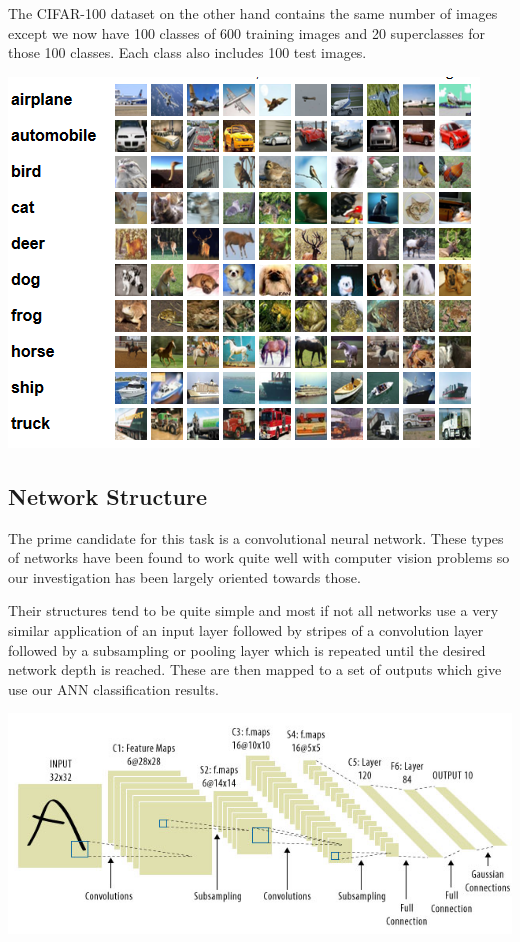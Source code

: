 \documentclass[a0,portrait]{a0poster}
\begin{document}
\begin{multicols}{2}
The CIFAR-100 dataset on the other hand contains the same number of images except we now have 100 classes of 600 training images and 20 superclasses for those 100 classes. Each class also includes 100 test images.
\begin{center}\vspace{1cm}
	\includegraphics[width=0.8\linewidth]{cifar10}
\end{center}\vspace{1cm}

\subsection{Network Structure}
The prime candidate for this task is a convolutional neural network. These types of networks have been found to work quite well with computer vision problems so our investigation has been largely oriented towards those.

Their structures tend to be quite simple and most if not all networks use a very similar application of an input layer followed by stripes of a convolution layer followed by a subsampling or pooling layer which is repeated until the desired network depth is reached. These are then mapped to a set of outputs which give use our ANN classification results.

\begin{center}\vspace{1cm}
	\includegraphics[width=0.8\linewidth]{common_cnn_design}
\end{center}\vspace{1cm}


\end{multicols}
\end{document}
